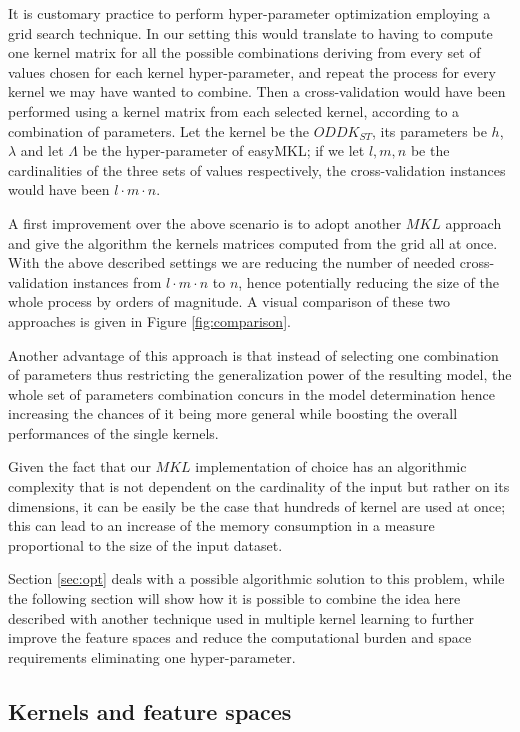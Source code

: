 It is customary practice to perform hyper-parameter optimization employing a grid
search technique.
In our setting this would translate to having to compute one kernel matrix
for all the possible combinations deriving from every set of values
chosen for each kernel hyper-parameter, and repeat the process for every kernel
we may have wanted to combine.
Then a cross-validation would have been performed using a kernel matrix from each
selected kernel, according to a combination of parameters.
Let the kernel be the $ODDK_{ST}$, its parameters be $h$, $\lambda$ and let $\Lambda$
be the hyper-parameter of easyMKL; if we let $l,m,n$ be the cardinalities of the three
sets of values respectively, the cross-validation instances would have been $l\cdot m\cdot n$.

A first improvement over the above scenario is to adopt another $MKL$ approach 
and give the algorithm the kernels matrices computed from the grid all at once.
With the above described settings we are reducing the number of needed
cross-validation instances from $l\cdot m\cdot n$ to $n$, hence potentially
reducing the size of the whole process by orders of magnitude.
A visual comparison of these two approaches is given in Figure \ref{fig:comparison}.

Another advantage of this approach is that instead of selecting one combination
of parameters thus restricting the generalization power of the resulting model,
the whole set of parameters combination concurs in the model determination hence
increasing the chances of it being more general while boosting the overall performances
of the single kernels.

Given the fact that our $MKL$ implementation of choice has an algorithmic
complexity that is not dependent on the cardinality of the input but rather on
its dimensions, it can be easily be the case that hundreds of kernel are used
at once; this can lead to an increase of the memory consumption in a measure
proportional to the size of the input dataset.

Section \ref{sec:opt} deals with a possible algorithmic solution to this problem,
while the following section will show how it is possible to combine the idea here
described with another technique used in multiple kernel learning to further
improve the feature spaces and reduce the computational burden and space
requirements eliminating one hyper-parameter.

\subsection{Kernels and feature spaces}
\label{subsec:features}

